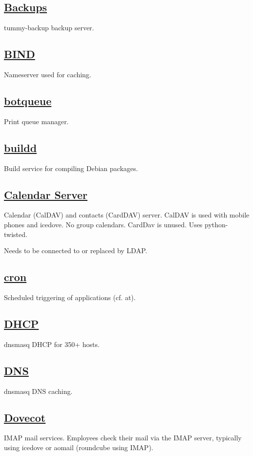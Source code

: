 \subsection{\href{https://github.com/tummy-dot-com/tummy-backup}{Backups}}
tummy-backup backup server.

\subsection{\href{http://www.isc.org/}{BIND}}
Nameserver used for caching.

\subsection{\href{http://www.botqueue.org/}{botqueue}}
Print queue manager.

\subsection{\href{http://www.debian.org/}{buildd}}
Build service for compiling Debian packages.

\subsection{\href{http://www.calendarserver.org/}{Calendar Server}}
Calendar (CalDAV) and contacts (CardDAV) server. CalDAV is used with mobile
phones and icedove. No group calendars. CardDav is unused. Uses python-twisted.

Needs to be connected to or replaced by LDAP.

\subsection{\href{http://ftp.isc.org/isc/cron/}{cron}}
Scheduled triggering of applications (cf. at).

\subsection{\href{http://dnsmasq.org/}{DHCP}}
dnsmasq DHCP for 350+ hosts.

\subsection{\href{http://dnsmasq.org/}{DNS}}
dnsmasq DNS caching.

\subsection{\href{http://dnsmasq.org/}{Dovecot}}
IMAP mail services. Employees check their mail via the
IMAP server, typically using icedove or aomail (roundcube using IMAP).


